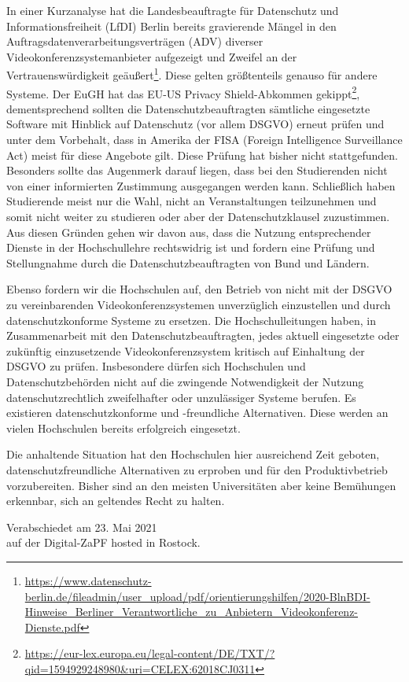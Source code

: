\documentclass[DIV=calc]{scrartcl}
\let\oldgrqq=\grqq
\def\grqq{\oldgrqq\xspace}
\begin{document}
In einer Kurzanalyse hat die Landesbeauftragte für Datenschutz und Informationsfreiheit (LfDI) Berlin bereits gravierende Mängel in den Auftragsdatenverarbeitungsverträgen (ADV) diverser Videokonferenzsystemanbieter aufgezeigt und Zweifel an der Vertrauenswürdigkeit geäußert\footnote{\url{https://www.datenschutz-berlin.de/fileadmin/user_upload/pdf/orientierungshilfen/2020-BlnBDI-Hinweise_Berliner_Verantwortliche_zu_Anbietern_Videokonferenz-Dienste.pdf}}. Diese gelten größtenteils genauso für andere Systeme. Der EuGH hat das \glqq EU-US Privacy Shield\grqq-Abkommen gekippt\footnote{\url{https://eur-lex.europa.eu/legal-content/DE/TXT/?qid=1594929248980&uri=CELEX:62018CJ0311}}, dementsprechend sollten die Datenschutzbeauftragten sämtliche eingesetzte Software mit Hinblick auf Datenschutz (vor allem DSGVO) erneut prüfen und unter dem Vorbehalt, dass in Amerika der FISA (Foreign Intelligence Surveillance Act) meist für diese Angebote gilt. Diese Prüfung hat bisher nicht stattgefunden. Besonders sollte das Augenmerk darauf liegen, dass bei den Studierenden nicht von einer \glqq informierten Zustimmung\grqq ausgegangen werden kann. Schließlich haben Studierende meist nur die Wahl, nicht an Veranstaltungen teilzunehmen und somit nicht weiter zu studieren oder aber der Datenschutzklausel zuzustimmen. Aus diesen Gründen gehen wir davon aus, dass die Nutzung entsprechender Dienste in der Hochschullehre rechtswidrig ist und fordern eine Prüfung und Stellungnahme durch die Datenschutzbeauftragten von Bund und Ländern. 

Ebenso fordern wir die Hochschulen auf, den Betrieb von nicht mit der DSGVO zu vereinbarenden Videokonferenzsystemen unverzüglich einzustellen und durch datenschutzkonforme Systeme zu ersetzen. Die Hochschulleitungen haben, in Zusammenarbeit mit den Datenschutzbeauftragten, jedes aktuell eingesetzte oder zukünftig einzusetzende Videokonferenzsystem kritisch auf Einhaltung der DSGVO zu prüfen. Insbesondere dürfen sich Hochschulen und Datenschutzbehörden nicht auf die zwingende Notwendigkeit der Nutzung datenschutzrechtlich zweifelhafter oder unzulässiger Systeme berufen. Es existieren datenschutzkonforme und -freundliche Alternativen. Diese werden an vielen Hochschulen bereits erfolgreich eingesetzt.

Die anhaltende Situation hat den Hochschulen hier ausreichend Zeit geboten, datenschutzfreundliche Alternativen zu erproben und für den Produktivbetrieb vorzubereiten. Bisher sind an den meisten Universitäten aber keine Bemühungen erkennbar, sich an geltendes Recht zu halten.


\vspace{1cm} 

\vfill
\begin{flushright}
	Verabschiedet am 23. Mai 2021 \\
	auf der Digital-ZaPF hosted in Rostock.
\end{flushright}
\end{document}
